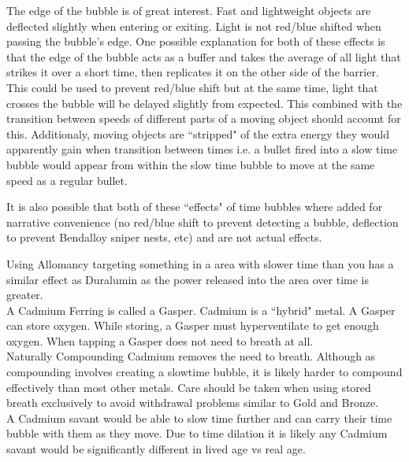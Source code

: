 \documentclass[conference]{IEEEtran}
\begin{document}
The edge of the bubble is of great interest.  Fast and lightweight objects are deflected slightly when entering or exiting.\cite{AoL-CH18}  Light is not red/blue shifted when passing the bubble's edge.\cite{red-blue}  One possible explanation for both of these effects is that the edge of the bubble acts as a buffer and takes the average of all light that strikes it over a short time, then replicates it on the other side of the barrier.  This could be used to prevent red/blue shift but at the same time, light that crosses the bubble will be delayed slightly from expected.  This combined with the transition between speeds of different parts of a moving object should account for this.  Additionaly, moving objects are ``stripped" of the extra energy they would apparently gain when transition between times i.e. a bullet fired into a slow time bubble would appear from within the slow time bubble to move at the same speed as a regular bullet.\cite{bubble-con}

It is also possible that both of these ``effects" of time bubbles where added for narrative convenience (no red/blue shift to prevent detecting a bubble, deflection to prevent Bendalloy sniper nests, etc) and are not actual effects.\cite{bubble-con}

Using Allomancy targeting something in a area with slower time than you has a similar effect as Duralumin as the power released into the area over time is greater.  \\

A Cadmium Ferring is called a Gasper.\cite{ARS}  Cadmium is a ``hybrid" metal.\cite{FE-TB}  A Gasper can store oxygen.\cite{ARS}  While storing, a Gasper must hyperventilate to get enough oxygen.  When tapping a Gasper does not need to breath at all.
\\
Naturally Compounding Cadmium removes the need to breath.  Although as compounding involves creating a slowtime bubble, it is likely harder to compound effectively than most other metals.  Care should be taken when using stored breath exclusively to avoid withdrawal problems similar to Gold and Bronze.\cite{AoL-CH13}\cite{TFE-CH38}\\

A Cadmium savant would be able to slow time further and can carry their time bubble with them as they move.\cite{Bubble-move}\cite{bubble-savant}  Due to time dilation it is likely any Cadmium savant would be significantly different in lived age vs real age.\\
\end{document}
